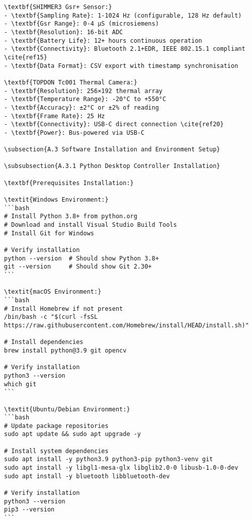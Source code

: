 \begin{verbatim}
\textbf{SHIMMER3 Gsr+ Sensor:}
- \textbf{Sampling Rate}: 1-1024 Hz (configurable, 128 Hz default)
- \textbf{Gsr Range}: 0-4 μS (microsiemens)
- \textbf{Resolution}: 16-bit ADC
- \textbf{Battery Life}: 12+ hours continuous operation
- \textbf{Connectivity}: Bluetooth 2.1+EDR, IEEE 802.15.1 compliant \cite{ref15}
- \textbf{Data Format}: CSV export with timestamp synchronisation

\textbf{TOPDON Tc001 Thermal Camera:}
- \textbf{Resolution}: 256×192 thermal array
- \textbf{Temperature Range}: -20°C to +550°C
- \textbf{Accuracy}: ±2°C or ±2% of reading
- \textbf{Frame Rate}: 25 Hz
- \textbf{Connectivity}: USB-C direct connection \cite{ref20}
- \textbf{Power}: Bus-powered via USB-C

\subsection{A.3 Software Installation and Environment Setup}

\subsubsection{A.3.1 Python Desktop Controller Installation}

\textbf{Prerequisites Installation:}

\textit{Windows Environment:}
```bash
# Install Python 3.8+ from python.org
# Download and install Visual Studio Build Tools
# Install Git for Windows

# Verify installation
python --version  # Should show Python 3.8+
git --version     # Should show Git 2.30+
```

\textit{macOS Environment:}
```bash
# Install Homebrew if not present
/bin/bash -c "$(curl -fsSL https://raw.githubusercontent.com/Homebrew/install/HEAD/install.sh)"

# Install dependencies
brew install python@3.9 git opencv

# Verify installation
python3 --version
which git
```

\textit{Ubuntu/Debian Environment:}
```bash
# Update package repositories
sudo apt update && sudo apt upgrade -y

# Install system dependencies
sudo apt install -y python3.9 python3-pip python3-venv git
sudo apt install -y libgl1-mesa-glx libglib2.0-0 libusb-1.0-0-dev
sudo apt install -y bluetooth libbluetooth-dev

# Verify installation
python3 --version
pip3 --version
```


\end{verbatim}
